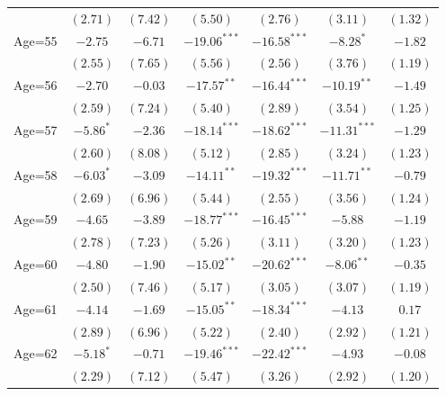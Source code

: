 \documentclass[fullpage]{paper}
\begin{document}
\begin{center}
\begin{longtable}{l c c c c c c }
            & $(2.71)$      & $(7.42)$      & $(5.50)$       & $(2.76)$       & $(3.11)$       & $(1.32)$      \\
Age=55      & $-2.75$       & $-6.71$       & $-19.06^{***}$ & $-16.58^{***}$ & $-8.28^{*}$    & $-1.82$       \\
            & $(2.55)$      & $(7.65)$      & $(5.56)$       & $(2.56)$       & $(3.76)$       & $(1.19)$      \\
Age=56      & $-2.70$       & $-0.03$       & $-17.57^{**}$  & $-16.44^{***}$ & $-10.19^{**}$  & $-1.49$       \\
            & $(2.59)$      & $(7.24)$      & $(5.40)$       & $(2.89)$       & $(3.54)$       & $(1.25)$      \\
Age=57      & $-5.86^{*}$   & $-2.36$       & $-18.14^{***}$ & $-18.62^{***}$ & $-11.31^{***}$ & $-1.29$       \\
            & $(2.60)$      & $(8.08)$      & $(5.12)$       & $(2.85)$       & $(3.24)$       & $(1.23)$      \\
Age=58      & $-6.03^{*}$   & $-3.09$       & $-14.11^{**}$  & $-19.32^{***}$ & $-11.71^{**}$  & $-0.79$       \\
            & $(2.69)$      & $(6.96)$      & $(5.44)$       & $(2.55)$       & $(3.56)$       & $(1.24)$      \\
Age=59      & $-4.65$       & $-3.89$       & $-18.77^{***}$ & $-16.45^{***}$ & $-5.88$        & $-1.19$       \\
            & $(2.78)$      & $(7.23)$      & $(5.26)$       & $(3.11)$       & $(3.20)$       & $(1.23)$      \\
Age=60      & $-4.80$       & $-1.90$       & $-15.02^{**}$  & $-20.62^{***}$ & $-8.06^{**}$   & $-0.35$       \\
            & $(2.50)$      & $(7.46)$      & $(5.17)$       & $(3.05)$       & $(3.07)$       & $(1.19)$      \\
Age=61      & $-4.14$       & $-1.69$       & $-15.05^{**}$  & $-18.34^{***}$ & $-4.13$        & $0.17$        \\
            & $(2.89)$      & $(6.96)$      & $(5.22)$       & $(2.40)$       & $(2.92)$       & $(1.21)$      \\
Age=62      & $-5.18^{*}$   & $-0.71$       & $-19.46^{***}$ & $-22.42^{***}$ & $-4.93$        & $-0.08$       \\
            & $(2.29)$      & $(7.12)$      & $(5.47)$       & $(3.26)$       & $(2.92)$       & $(1.20)$      \\

\end{longtable}
\end{center}
\end{document}
